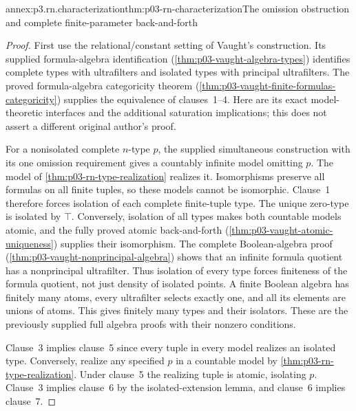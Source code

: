 \begin{annexitem}{annex:p3.rn.characterization}{thm:p03-rn-characterization}{The omission obstruction and complete finite-parameter back-and-forth}
\begin{proof}
First use the relational/constant setting of Vaught's
construction. Its supplied formula-algebra identification
(\cref{thm:p03-vaught-algebra-types}) identifies complete
types with ultrafilters and isolated types with principal
ultrafilters.
The proved formula-algebra categoricity theorem
(\cref{thm:p03-vaught-finite-formulas-categoricity})
supplies the equivalence of clauses~1--4.
Here are its exact model-theoretic interfaces and the
additional saturation implications; this does not assert
a different original author's proof.

For a nonisolated complete \(n\)-type \(p\), the supplied
simultaneous construction with its one omission requirement
gives a countably infinite model omitting \(p\).
The model of \cref{thm:p03-rn-type-realization} realizes it.
Isomorphisms preserve all formulas on all finite tuples,
so these models cannot be isomorphic.
Clause~1 therefore forces isolation of each complete
finite-tuple type. The unique zero-type is isolated by
\(\top\).
Conversely, isolation of all types makes both countable
models atomic, and the fully proved atomic back-and-forth
(\cref{thm:p03-vaught-atomic-uniqueness}) supplies their
isomorphism.
The complete Boolean-algebra proof
(\cref{thm:p03-vaught-nonprincipal-algebra}) shows that
an infinite formula quotient has a nonprincipal
ultrafilter. Thus isolation of every type forces finiteness
of the formula quotient, not just density of isolated
points. A finite Boolean algebra has finitely many atoms,
every ultrafilter selects exactly one, and all its elements
are unions of atoms. This gives finitely many types and
their isolators. These are the previously supplied
full algebra proofs with their nonzero conditions.

Clause~3 implies clause~5 since every tuple in every model
realizes an isolated type.
Conversely, realize any specified \(p\) in a countable
model by \cref{thm:p03-rn-type-realization}.
Under clause~5 the realizing tuple is atomic, isolating \(p\).
Clause~3 implies clause~6 by the isolated-extension lemma,
and clause~6 implies clause~7.


\end{proof}
\end{annexitem}
